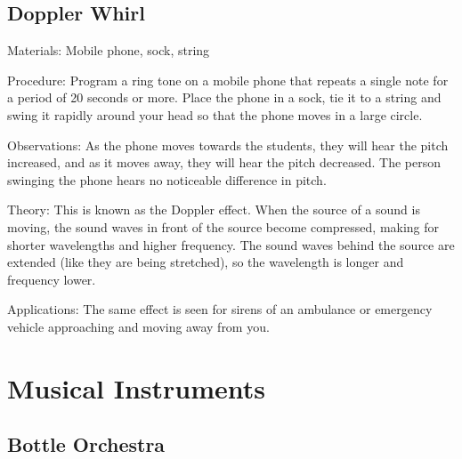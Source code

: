 \begin{multicols}{2}
\subsection{Doppler Whirl}


\begin{description*}
\item[Materials:]{Mobile phone, sock, string}
\item[Procedure:]{Program a ring tone on a mobile phone that repeats a single note for a period of 20 seconds or more. Place the phone in a sock, tie it to a string and swing it rapidly around your head so that the phone moves in a large circle.}
\item[Observations:]{As the phone moves towards the students, they will hear the pitch increased, and as it moves away, they will hear the pitch decreased. The person swinging the phone hears no noticeable difference in pitch.}
\item[Theory:]{This is known as the Doppler effect. When the source of a sound is moving, the sound waves in front of the source become compressed, making for shorter wavelengths and higher frequency. The sound waves behind the source are extended (like they are being stretched), so the wavelength is longer and frequency lower.}
\item[Applications:]{The same effect is seen for sirens of an ambulance or emergency vehicle approaching and moving away from you.}
\end{description*}


\section*{Musical Instruments}


\subsection{Bottle Orchestra}


\end{multicols}
